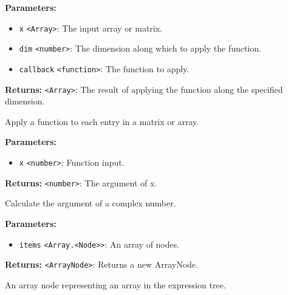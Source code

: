 \documentclass[12pt,a4paper]{article}
\begin{document}
\noindent \textbf{Parameters:}
\begin{itemize}
  \item \texttt{x} \texttt{<Array>}: The input array or matrix.
  \item \texttt{dim} \texttt{<number>}: The dimension along which to apply the function.
  \item \texttt{callback} \texttt{<function>}: The function to apply.
\end{itemize}

\noindent \textbf{Returns:} \texttt{<Array>}: The result of applying the function along the specified dimension.

\noindent Apply a function to each entry in a matrix or array.

\vspace{5mm}
\noindent {}


\noindent \textbf{Parameters:}
\begin{itemize}
  \item \texttt{x} \texttt{<number>}: Function input.
\end{itemize}

\noindent \textbf{Returns:} \texttt{<number>}: The argument of \textasciigrave{}x\textasciigrave{}.

\noindent Calculate the argument of a complex number.

\vspace{5mm}
\noindent {}


\noindent \textbf{Parameters:}
\begin{itemize}
  \item \texttt{items} \texttt{<Array.<Node>>}: An array of nodes.
\end{itemize}

\noindent \textbf{Returns:} \texttt{<ArrayNode>}: Returns a new ArrayNode.

\noindent An array node representing an array in the expression tree.

\vspace{5mm}
\noindent {}
\end{document}
